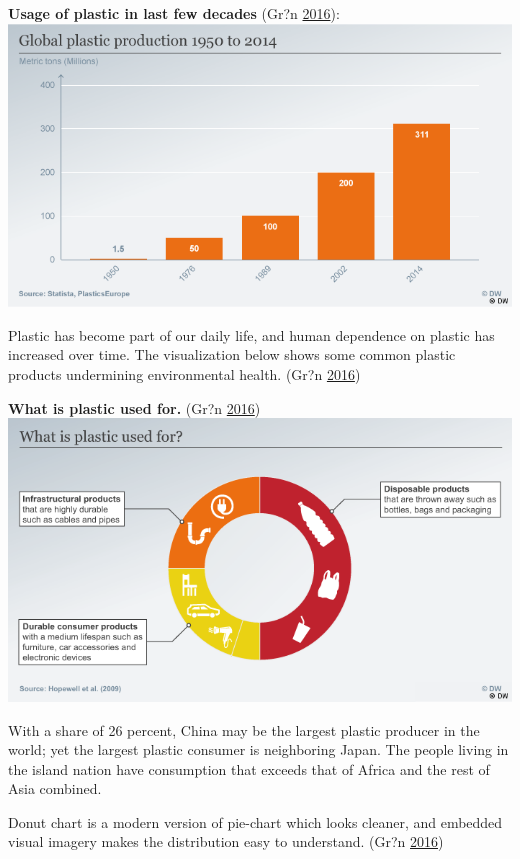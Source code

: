 \documentclass[]{book}
\begin{document}
\textbf{Usage of plastic in last few decades} (Gr?n
\protect\hyperlink{ref-plastic_pollution_visualizations}{2016}):
\includegraphics{images/global_plastic_usage.png}

Plastic has become part of our daily life, and human dependence on
plastic has increased over time. The visualization below shows some
common plastic products undermining environmental health. (Gr?n
\protect\hyperlink{ref-plastic_pollution_visualizations}{2016})

\textbf{What is plastic used for.} (Gr?n
\protect\hyperlink{ref-plastic_pollution_visualizations}{2016})
\includegraphics{images/use_of_plastic.png}

With a share of 26 percent, China may be the largest plastic producer in
the world; yet the largest plastic consumer is neighboring Japan. The
people living in the island nation have consumption that exceeds that of
Africa and the rest of Asia combined.

Donut chart is a modern version of pie-chart which looks cleaner, and
embedded visual imagery makes the distribution easy to understand. (Gr?n
\protect\hyperlink{ref-plastic_pollution_visualizations}{2016})
\end{document}
